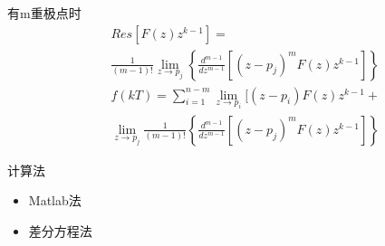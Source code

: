 \begin{frame}
\begin{block}{有m重极点时}
\begin{eqnarray*}
&&Res[F(z)z^{k-1}]=\\
&&\frac{1}{(m-1)!}\lim_{z\to p_j}\left\lbrace\frac{d^{m-1}}{dz^{m-1}}[(z-p_j)^mF(z)z^{k-1}]\right\rbrace\\
&&f(kT)=\sum\limits_{i=1}^{n-m}\lim_{z\to p_i}[(z-p_i)F(z)z^{k-1}+\\
&&\lim_{z\to p_j}\frac{1}{(m-1)!}\left\lbrace\frac{d^{m-1}}{dz^{m-1}}[(z-p_j)^mF(z)z^{k-1}]\right\rbrace
\end{eqnarray*}
\end{block}
\end{frame}
\begin{frame}
\begin{block}{计算法}
\begin{itemize}
\item Matlab法
\item 差分方程法
\end{itemize}
\end{block}
\end{frame}
